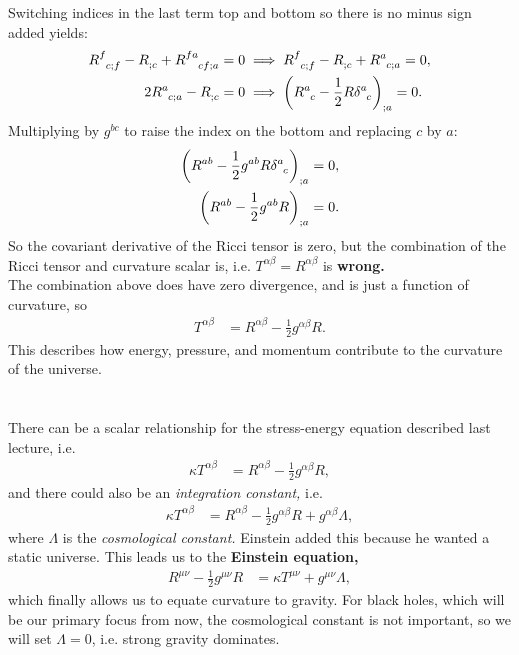 \documentclass[a4paper, 11pt, normalem]{report}
\begin{document}
Switching indices in the last term top and bottom so there is no minus sign added yields:
\begin{align}
    \tensor{R}{^f_{c;f}} - \tensor{R}{_{;c}} + \tensor{R}{^{fa}_{cf;a}} &= 0 \implies 
    \tensor{R}{^f_{c;f}} - \tensor{R}{_{;c}} + \tensor{R}{^{a}_{c;a}} = 0,\\
    2\tensor{R}{^a_{c;a}} - \tensor{R}{_{;c}} &= 0 \implies
    \left(\tensor{R}{^a_c} - \frac12R\tensor{\delta}{^a_c}\right)_{;a} = 0.
\end{align}
Multiplying by $g^{bc}$ to raise the index on the bottom and replacing $c$ by $a$:
\begin{align}
    \left(R^{ab} - \frac12g^{ab}R\tensor{\delta}{^a_c}\right)_{;a} &= 0,\\
    \left(R^{ab} - \frac12g^{ab}R\right)_{;a} &= 0.
\end{align}
So the covariant derivative of the Ricci tensor is  zero, but the combination of the Ricci tensor and curvature scalar is, i.e. $T^{\alpha\beta}=R^{\alpha\beta}$ is \textbf{wrong.}\\
The combination above does have zero divergence, and is just a function of curvature, so
\begin{align}
    T^{\alpha\beta} &= R^{\alpha\beta} - \frac12g^{\alpha\beta}R.
\end{align}
This describes how energy, pressure, and momentum contribute to the curvature of the universe.

\chapter{}
There can be a scalar relationship for the stress-energy equation described last lecture, i.e.
\begin{align}
    \kappa T^{\alpha\beta} &= R^{\alpha\beta} - \frac12 g^{\alpha\beta}R,
\end{align}
and there could also be an \emph{integration constant,} i.e.
\begin{align}
    \kappa T^{\alpha\beta} &= R^{\alpha\beta} - \frac12g^{\alpha\beta}R + g^{\alpha\beta}\Lambda,
\end{align}
where $\Lambda$ is the \emph{cosmological constant.}
Einstein added this because he wanted a static universe. 
This leads us to the \textbf{Einstein equation,}
\begin{align}
    R^{\mu\nu} - \frac12g^{\mu\nu}R &= \kappa T^{\mu\nu} + g^{\mu\nu}\Lambda,
\end{align}
which finally allows us to equate curvature to gravity. 
For black holes, which will be our primary focus from now, the cosmological constant is not important, so we will set $\Lambda=0$, i.e. strong gravity dominates.
\end{document}
